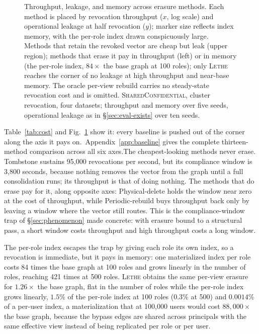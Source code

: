 \documentclass[sigconf, nonacm, review]{acmart}
\newif\ifextended\extendedtrue %
\begin{document}
\begin{figure}[t]
{%
}
\caption{Throughput, leakage, and memory across erasure methods. Each method is
placed by revocation throughput ($x$, log scale) and operational leakage at
half revocation ($y$); marker size reflects index memory, with the per-role
index drawn conspicuously large. Methods that retain the revoked vector are cheap but leak (upper region);
methods that erase it pay in throughput (left) or in memory (the per-role index,
$84\times$ the base graph at 100 roles); only \textsc{Lethe} reaches the corner of no leakage
at high throughput and near-base memory. The oracle per-view rebuild carries no
steady-state revocation cost and is omitted. \textsc{SharedConfidential}, cluster
revocation, four datasets; throughput and memory over five seeds, operational leakage as in \S\ref{sec:eval-exists} over ten
seeds.}
\label{fig:dominance}
\end{figure}

Table~\ref{tab:cost} and Fig.~\ref{fig:dominance} show it:
every baseline is pushed out of the corner along the axis it pays on.\ifextended\ Appendix~\ref{app:baseline} gives the complete thirteen-method comparison across all six axes.\fi The cheapest-looking methods
never erase. Tombstone sustains 95{,}000 revocations per second,
but its compliance window is 3{,}800 seconds, because nothing removes the
vector from the graph until a full consolidation runs; its throughput is that of doing nothing. The methods that do erase pay for it, along
opposite axes: Physical-delete holds the window near zero at the cost of
throughput, while Periodic-rebuild buys throughput back only by leaving a
window where the vector still routes. This is the compliance-window trap of
\S\ref{sec:phenomenon} made concrete: with erasure bound to a structural
pass, a short window costs throughput and high throughput costs a long
window.

The per-role index escapes the trap by giving each role its own index, so a
revocation is immediate, but it pays in memory: one materialized index per
role costs 84 times the base graph at 100 roles and grows linearly in the
number of roles, reaching 421 times at 500 roles. \textsc{Lethe} obtains the same per-view erasure for
$1.26\times$ the base graph, flat in the number of roles while the per-role
index grows linearly, $1.5\%$ of the per-role index at 100
roles ($0.3\%$ at 500) and $0.0014\%$ of a per-user index, a materialization
that at 100{,}000 users would cost $88{,}000\times$ the base graph, because the bypass
edges are shared across principals with the same effective view instead of
being replicated per role or per user.
\end{document}
